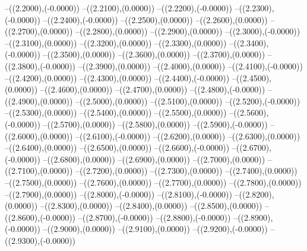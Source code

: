 {	--({\sx*(2.2000)},{\sy*(-0.0000)})
	--({\sx*(2.2100)},{\sy*(0.0000)})
	--({\sx*(2.2200)},{\sy*(-0.0000)})
	--({\sx*(2.2300)},{\sy*(-0.0000)})
	--({\sx*(2.2400)},{\sy*(-0.0000)})
	--({\sx*(2.2500)},{\sy*(0.0000)})
	--({\sx*(2.2600)},{\sy*(0.0000)})
	--({\sx*(2.2700)},{\sy*(0.0000)})
	--({\sx*(2.2800)},{\sy*(0.0000)})
	--({\sx*(2.2900)},{\sy*(0.0000)})
	--({\sx*(2.3000)},{\sy*(-0.0000)})
	--({\sx*(2.3100)},{\sy*(0.0000)})
	--({\sx*(2.3200)},{\sy*(0.0000)})
	--({\sx*(2.3300)},{\sy*(0.0000)})
	--({\sx*(2.3400)},{\sy*(-0.0000)})
	--({\sx*(2.3500)},{\sy*(0.0000)})
	--({\sx*(2.3600)},{\sy*(0.0000)})
	--({\sx*(2.3700)},{\sy*(0.0000)})
	--({\sx*(2.3800)},{\sy*(-0.0000)})
	--({\sx*(2.3900)},{\sy*(0.0000)})
	--({\sx*(2.4000)},{\sy*(0.0000)})
	--({\sx*(2.4100)},{\sy*(-0.0000)})
	--({\sx*(2.4200)},{\sy*(0.0000)})
	--({\sx*(2.4300)},{\sy*(0.0000)})
	--({\sx*(2.4400)},{\sy*(-0.0000)})
	--({\sx*(2.4500)},{\sy*(0.0000)})
	--({\sx*(2.4600)},{\sy*(0.0000)})
	--({\sx*(2.4700)},{\sy*(0.0000)})
	--({\sx*(2.4800)},{\sy*(-0.0000)})
	--({\sx*(2.4900)},{\sy*(0.0000)})
	--({\sx*(2.5000)},{\sy*(0.0000)})
	--({\sx*(2.5100)},{\sy*(0.0000)})
	--({\sx*(2.5200)},{\sy*(-0.0000)})
	--({\sx*(2.5300)},{\sy*(0.0000)})
	--({\sx*(2.5400)},{\sy*(0.0000)})
	--({\sx*(2.5500)},{\sy*(0.0000)})
	--({\sx*(2.5600)},{\sy*(-0.0000)})
	--({\sx*(2.5700)},{\sy*(0.0000)})
	--({\sx*(2.5800)},{\sy*(0.0000)})
	--({\sx*(2.5900)},{\sy*(-0.0000)})
	--({\sx*(2.6000)},{\sy*(0.0000)})
	--({\sx*(2.6100)},{\sy*(-0.0000)})
	--({\sx*(2.6200)},{\sy*(0.0000)})
	--({\sx*(2.6300)},{\sy*(0.0000)})
	--({\sx*(2.6400)},{\sy*(0.0000)})
	--({\sx*(2.6500)},{\sy*(0.0000)})
	--({\sx*(2.6600)},{\sy*(-0.0000)})
	--({\sx*(2.6700)},{\sy*(-0.0000)})
	--({\sx*(2.6800)},{\sy*(0.0000)})
	--({\sx*(2.6900)},{\sy*(0.0000)})
	--({\sx*(2.7000)},{\sy*(0.0000)})
	--({\sx*(2.7100)},{\sy*(0.0000)})
	--({\sx*(2.7200)},{\sy*(0.0000)})
	--({\sx*(2.7300)},{\sy*(0.0000)})
	--({\sx*(2.7400)},{\sy*(0.0000)})
	--({\sx*(2.7500)},{\sy*(0.0000)})
	--({\sx*(2.7600)},{\sy*(0.0000)})
	--({\sx*(2.7700)},{\sy*(0.0000)})
	--({\sx*(2.7800)},{\sy*(0.0000)})
	--({\sx*(2.7900)},{\sy*(0.0000)})
	--({\sx*(2.8000)},{\sy*(-0.0000)})
	--({\sx*(2.8100)},{\sy*(-0.0000)})
	--({\sx*(2.8200)},{\sy*(0.0000)})
	--({\sx*(2.8300)},{\sy*(0.0000)})
	--({\sx*(2.8400)},{\sy*(0.0000)})
	--({\sx*(2.8500)},{\sy*(0.0000)})
	--({\sx*(2.8600)},{\sy*(-0.0000)})
	--({\sx*(2.8700)},{\sy*(-0.0000)})
	--({\sx*(2.8800)},{\sy*(-0.0000)})
	--({\sx*(2.8900)},{\sy*(-0.0000)})
	--({\sx*(2.9000)},{\sy*(0.0000)})
	--({\sx*(2.9100)},{\sy*(0.0000)})
	--({\sx*(2.9200)},{\sy*(-0.0000)})
	--({\sx*(2.9300)},{\sy*(-0.0000)})
}
